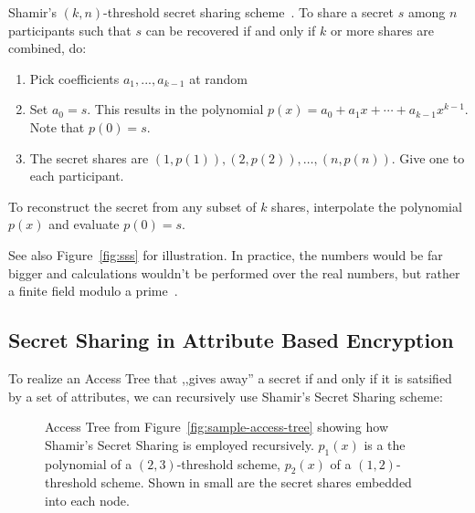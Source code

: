 \begin{definition}
    Shamir's $(k, n)$-threshold secret sharing scheme~\cite{shamir_how_1979}.
    To share a secret $s$ among $n$ participants such that $s$ can be recovered if and only if $k$ or more shares are combined, do:
    \begin{enumerate}
        \item Pick coefficients $a_1, ..., a_{k-1}$ at random 
        \item Set $a_0 = s$. This results in the polynomial $p(x) = a_0 + a_1x + \cdots + a_{k-1}x^{k-1}$. Note that $p(0) = s$.
        \item The secret shares are $(1, p(1)), (2, p(2)), \dots, (n, p(n))$. Give one to each participant.
    \end{enumerate}
    To reconstruct the secret from any subset of $k$ shares, interpolate the polynomial $p(x)$ and evaluate $p(0) = s$. 
\end{definition}

See also Figure~\ref{fig:sss} for illustration.
In practice, the numbers would be far bigger and calculations wouldn't be performed over the real numbers, but rather a finite field modulo a prime~\cite{shamir_how_1979}.

\subsection{Secret Sharing in Attribute Based Encryption}\label{sec:lss-in-access-trees}
To realize an Access Tree that ,,gives away'' a secret if and only if it is satsified by a set of attributes, we can recursively use Shamir's Secret Sharing scheme:

\begin{figure}
    \centering
    \caption[Shamir's Secret sharing in Access Trees]{
        Access Tree from Figure~\ref{fig:sample-access-tree} showing how Shamir's Secret Sharing is employed recursively.
        $p_1(x)$ is a the polynomial of a $(2,3)$-threshold scheme, $p_2(x)$ of a $(1,2)$-threshold scheme.
        Shown in small are the secret shares embedded into each node.
    }
    \label{fig:sample-access-tree-shamir}
\end{figure}

